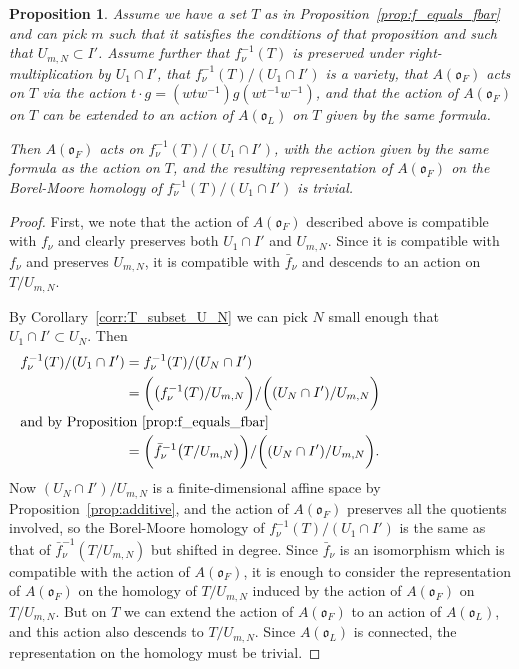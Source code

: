 \documentclass{amsart}
\newtheorem{prop}{Proposition}[subsection]
\theoremstyle{definition}
\def\O{\mathfrak{o}}
\def\A{A(\O_F)}
\def\f{f_\nu}
\def\ff{\bar{f}_\nu}
\def\Umn{U_{m,N}}
\begin{document}
  \begin{prop}
    \label{prop:trivial-action}
    Assume we have a set $T$ as in Proposition~\ref{prop:f_equals_fbar} and can
    pick $m$ such that it satisfies the conditions of that proposition and such
    that $\Umn \subset I'$.  Assume further that $\f^{-1}(T)$ is preserved
    under right-multiplication by $U_1 \cap I'$, that $\f^{-1}(T)/(U_1 \cap
    I')$ is a variety, that $\A$ acts on $T$ via the action $t \cdot g =
    (wtw^{-1}) g (wt^{-1}w^{-1})$, and that the action of $\A$ on $T$ can be
    extended to an action of $A(\O_L)$ on $T$ given by the same formula.

    Then $\A$ acts on $\f^{-1}(T)/(U_1 \cap I')$, with the action given by the
    same formula as the action on $T$, and the resulting representation of $\A$
    on the Borel-Moore homology of $\f^{-1}(T)/(U_1 \cap I')$ is trivial.
  \end{prop}
  \begin{proof}
    First, we note that the action of $\A$ described above is compatible with
    $\f$ and clearly preserves both $U_1 \cap I'$ and $\Umn$.  Since it is
    compatible with $\f$ and preserves $\Umn$, it is compatible with $\ff$ and
    descends to an action on $T/\Umn$.
  
    By Corollary~\ref{corr:T_subset_U_N} we can pick $N$ small enough that $U_1
    \cap I' \subset U_N$.  Then
    \begin{align*}
      \f^{-1}(T)/(U_1 \cap I') &= \f^{-1}(T)/(U_N \cap I') \\
      &=  \biggl(\bigl(\f^{-1}(T)/\Umn \biggr)/\biggl((U_N
      \cap I') / \Umn\biggr) \\
      \noalign{\noindent and by Proposition~\ref{prop:f_equals_fbar}}
      & = \biggl(\ff^{-1}\bigl(T/\Umn\bigr)\biggr)/\biggl((U_N
      \cap I') / \Umn\biggr).
    \end{align*}
    Now $(U_N \cap I') / \Umn$ is a finite-dimensional affine space by
    Proposition~\ref{prop:additive}, and the action of $\A$ preserves all the
    quotients involved, so the Borel-Moore homology of $\f^{-1}(T)/(U_1 \cap
    I')$ is the same as that of $\ff^{-1}(T/\Umn)$ but shifted in degree.
    Since $\ff$ is an isomorphism which is compatible with the action of $\A$,
    it is enough to consider the representation of $\A$ on the homology of
    $T/\Umn$ induced by the action of $\A$ on $T/\Umn$.  But on $T$ we can
    extend the action of $\A$ to an action of $A(\O_L)$, and this action also
    descends to $T/\Umn$.  Since $A(\O_L)$ is connected, the representation on
    the homology must be trivial.
  \end{proof}
\end{document}
